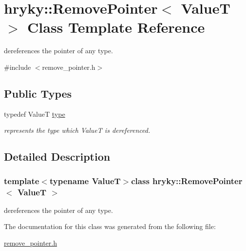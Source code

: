 \hypertarget{classhryky_1_1_remove_pointer}{\section{hryky\-:\-:Remove\-Pointer$<$ Value\-T $>$ Class Template Reference}
\label{classhryky_1_1_remove_pointer}
}


dereferences the pointer of any type.  




{\ttfamily \#include $<$remove\-\_\-pointer.\-h$>$}

\subsection*{Public Types}
\begin{DoxyCompactItemize}
\item 
\hypertarget{classhryky_1_1_remove_pointer_a7137db713acb2cd6b5a368ee5cca3842}{typedef Value\-T \hyperlink{classhryky_1_1_remove_pointer_a7137db713acb2cd6b5a368ee5cca3842}{type}}\label{classhryky_1_1_remove_pointer_a7137db713acb2cd6b5a368ee5cca3842}

\begin{DoxyCompactList}\small\item\em represents the type which Value\-T is dereferenced. \end{DoxyCompactList}\end{DoxyCompactItemize}


\subsection{Detailed Description}
\subsubsection*{template$<$typename Value\-T$>$class hryky\-::\-Remove\-Pointer$<$ Value\-T $>$}

dereferences the pointer of any type. 

The documentation for this class was generated from the following file\-:\begin{DoxyCompactItemize}
\item 
\hyperlink{remove__pointer_8h}{remove\-\_\-pointer.\-h}\end{DoxyCompactItemize}
